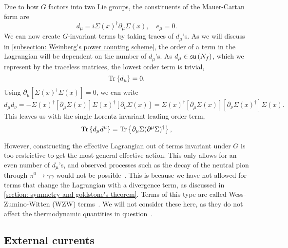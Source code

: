 %
Due to how $G$ factors into two Lie groups, the constituents of the Mauer-Cartan form are 
%
\begin{equation}
    d_\mu = i \Sigma(x)^\dagger \partial_\mu \Sigma(x),\quad
    e_\mu = 0.
\end{equation}
%
We can now create $G$-invariant terms by taking traces of $d_\mu$'s.
As we will discuss in \autoref{subsection: Weinberg's power counting scheme}, the order of a term in the Lagrangian will be dependent on the number of $d_\mu$'s.
As $d_\mu \in \mathfrak{su}\left(N_f\right)$, which we represent by the traceless matrices, the lowest order term is trivial,
%
\begin{equation}
    \text{Tr} \left\{ d_\mu \right\} = 0.
\end{equation}
%
Using $\partial_\mu [\Sigma(x)^\dagger\Sigma(x)] = 0 $, we can write
\begin{equation}
    d_\mu d_\nu = 
    - \Sigma(x)^\dagger [\partial_\mu \Sigma(x)] \Sigma(x)^\dagger [\partial_\nu \Sigma(x)]
    =\Sigma(x)^\dagger [\partial_\mu \Sigma(x)] [\partial_\nu \Sigma(x)^\dagger] \Sigma(x).
\end{equation}
%
This leaves us with the single Lorentz invariant leading order term,
\begin{equation}
    \text{Tr} \left\{ d_\mu d^\mu \right\} = \text{Tr} \left\{ \partial_\mu \Sigma (\partial^\mu \Sigma)^\dagger \right\},
\end{equation}


However, constructing the effective Lagrangian out of terms invariant under $G$ is too restrictive to get the most general effective action.
This only allows for an even number of $d_\mu$'s, and observed processes such as the decay of the neutral pion through $\pi^0 \rightarrow \gamma \gamma$ would not be possible~\cite{schererIntroductionChiralPerturbation2002}.
This is because we have not allowed for terms that change the Lagrangian with a divergence term, as discussed in \autoref{section: symmetry and goldstone's theorem}.
Terms of this type are called Wess-Zumino-Witten (WZW) terms~\cite{weinbergQuantumTheoryFields1996}.
We will not consider these here, as they do not affect the thermodynamic quantities in question~\cite{adhikariTwoflavorChiralPerturbation2019}.

\subsection{External currents}


